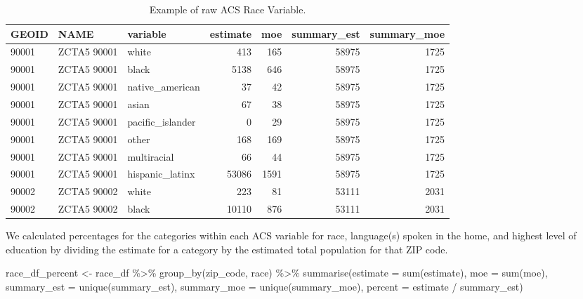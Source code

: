 \documentclass[
  11 pt,
  openany]{book}
\newenvironment{Shaded}{\begin{snugshade}}{\end{snugshade}}
\newcommand{\AttributeTok}[1]{\textcolor[rgb]{0.77,0.63,0.00}{#1}}
\newcommand{\FunctionTok}[1]{\textcolor[rgb]{0.00,0.00,0.00}{#1}}
\newcommand{\NormalTok}[1]{#1}
\newcommand{\OtherTok}[1]{\textcolor[rgb]{0.56,0.35,0.01}{#1}}
\newcommand{\SpecialCharTok}[1]{\textcolor[rgb]{0.00,0.00,0.00}{#1}}
\begin{document}
\begin{table}

\caption{\label{tab:unnamed-chunk-20}Example of raw ACS Race Variable.}
\centering
\begin{tabular}[t]{l|l|l|r|r|r|r}
\hline
GEOID & NAME & variable & estimate & moe & summary\_est & summary\_moe\\
\hline
90001 & ZCTA5 90001 & white & 413 & 165 & 58975 & 1725\\
\hline
90001 & ZCTA5 90001 & black & 5138 & 646 & 58975 & 1725\\
\hline
90001 & ZCTA5 90001 & native\_american & 37 & 42 & 58975 & 1725\\
\hline
90001 & ZCTA5 90001 & asian & 67 & 38 & 58975 & 1725\\
\hline
90001 & ZCTA5 90001 & pacific\_islander & 0 & 29 & 58975 & 1725\\
\hline
90001 & ZCTA5 90001 & other & 168 & 169 & 58975 & 1725\\
\hline
90001 & ZCTA5 90001 & multiracial & 66 & 44 & 58975 & 1725\\
\hline
90001 & ZCTA5 90001 & hispanic\_latinx & 53086 & 1591 & 58975 & 1725\\
\hline
90002 & ZCTA5 90002 & white & 223 & 81 & 53111 & 2031\\
\hline
90002 & ZCTA5 90002 & black & 10110 & 876 & 53111 & 2031\\
\hline
\end{tabular}
\end{table}

We calculated percentages for the categories within each ACS variable for race, language(s) spoken in the home, and highest level of education by dividing the estimate for a category by the estimated total population for that ZIP code.

\begin{Shaded}
\begin{Highlighting}[]
\NormalTok{race\_df\_percent }\OtherTok{\textless{}{-}} 
\NormalTok{  race\_df }\SpecialCharTok{\%\textgreater{}\%} 
  \FunctionTok{group\_by}\NormalTok{(zip\_code, race) }\SpecialCharTok{\%\textgreater{}\%} 
  \FunctionTok{summarise}\NormalTok{(}\AttributeTok{estimate =} \FunctionTok{sum}\NormalTok{(estimate),}
            \AttributeTok{moe =} \FunctionTok{sum}\NormalTok{(moe),}
            \AttributeTok{summary\_est =} \FunctionTok{unique}\NormalTok{(summary\_est),}
            \AttributeTok{summary\_moe =} \FunctionTok{unique}\NormalTok{(summary\_moe),}
            \AttributeTok{percent =}\NormalTok{ estimate }\SpecialCharTok{/}\NormalTok{ summary\_est)}
\end{Highlighting}
\end{Shaded}
\end{document}
